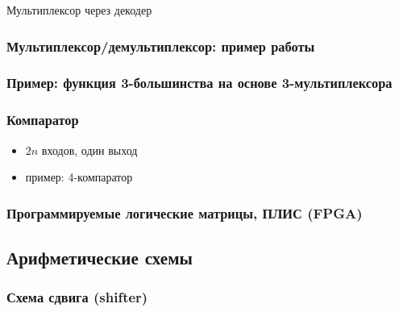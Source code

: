 \begin{frame}{Мультиплексор через декодер}\pause
{}
\end{frame}

\begin{frame}
\frametitle{Мультиплексор/демультиплексор: пример работы}
\centering
{}
\end{frame}

\begin{frame}
\frametitle{Пример: функция 3-большинства на основе 3-мультиплексора}
\end{frame}

\begin{frame}
\frametitle{Компаратор}
\begin{itemize}
    \item $2n$ входов, один выход
    \item \pause пример: 4-компаратор\\
\end{itemize}
\end{frame}

\begin{frame}[plain]
\frametitle{Программируемые логические матрицы, ПЛИС (FPGA)}
\vspace{-.3cm}
\end{frame}

\subsection{Арифметические схемы}

\begin{frame}
\frametitle{Схема сдвига (shifter)}
\end{frame}

